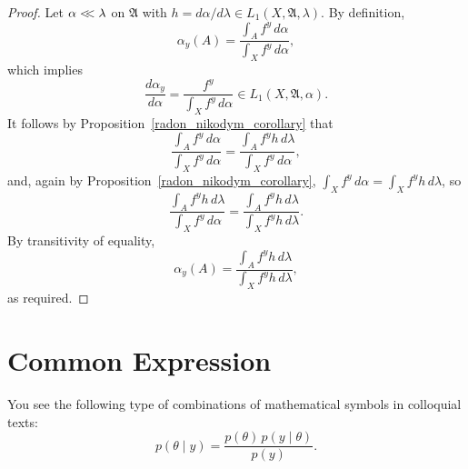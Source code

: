 \documentclass[
twoside=true,
paper=letter,
fontsize=9pt,
pagesize=auto,
leqno,
openany,
headsepline,
overfullrule,
]{scrbook}
\theoremstyle{plain}
\theoremstyle{plain}
\theoremstyle{definition}
\theoremstyle{bfnoteitalic}
\theoremstyle{bfnoteroman}
\newcommand{\sigalg}[1]{\mathfrak{#1}}
\newcommand{\funcf}{f}
\newcommand{\funch}{h}
\newcommand{\function}{f}
\newcommand{\functioniii}{h}
\newcommand{\measurespace}{X}
\newcommand{\abscont}{\mathrel{< \kern-3.5pt <}}
\newcommand{\measlambda}{\lambda}
\newcommand{\pspace}{\measurespace}%
\newcommand{\pspaceset}{A}
\newcommand{\sspaceelt}{y}
\newcommand{\pspacesig}{\sigalg{A}}
\newcommand{\marginalone}{\alpha}%
\newcommand{\prior}{\marginalone}
\begin{document}
\begin{proof}
Let
$\prior\abscont\measlambda$ on $\pspacesig$ with
$\funch
= d\prior/d\measlambda
\in L_1(\pspace, \pspacesig, \measlambda)$.
By definition,
\[
\prior_\sspaceelt(\pspaceset) =
\frac{\int_\pspaceset \function^\sspaceelt \, d\prior}
{\int_\pspace \function^\sspaceelt \, d\prior},
\]
which implies
\[
\frac{d\prior_\sspaceelt}{d\prior}
=
\frac{\funcf^\sspaceelt}
{\int_\pspace \function^\sspaceelt \, d\prior}
\in L_1(\pspace, \pspacesig, \prior).
\]
It follows by Proposition~\ref{radon_nikodym_corollary} that
\[
\frac{\int_\pspaceset \function^\sspaceelt \, d\prior}
{\int_\pspace \function^\sspaceelt \, d\prior}
=
\frac{\int_\pspaceset\function^\sspaceelt\functioniii\,d\measlambda}
{\int_\pspace\function^\sspaceelt\,d\prior},
\]
and, again by Proposition~\ref{radon_nikodym_corollary},
$\int_\pspace\function^\sspaceelt\,d\prior
=
\int_\pspace\function^\sspaceelt\functioniii\,d\measlambda$,
so
\[
\frac{\int_\pspaceset\function^\sspaceelt\functioniii\,d\measlambda}
{\int_\pspace\function^\sspaceelt\,d\prior}
=
\frac{\int_\pspaceset\function^\sspaceelt\functioniii\,d\measlambda}
{\int_\pspace\function^\sspaceelt\functioniii\,d\measlambda}.
\]
By transitivity of equality,
\[
\prior_\sspaceelt(\pspaceset)
=
\frac{\int_\pspaceset\function^\sspaceelt\functioniii\,d\measlambda}
{\int_\pspace\function^\sspaceelt\functioniii\,d\measlambda},
\]
as required.
\end{proof}





\section{Common Expression}\label{common_expression}
You see the following type of combinations of mathematical symbols in colloquial texts:
\begin{equation}\label{quaint}
p(\theta \mid y)
=
\frac{p(\theta) \, p(y \mid \theta)}
{p(y)}.
\end{equation}
\end{document}
